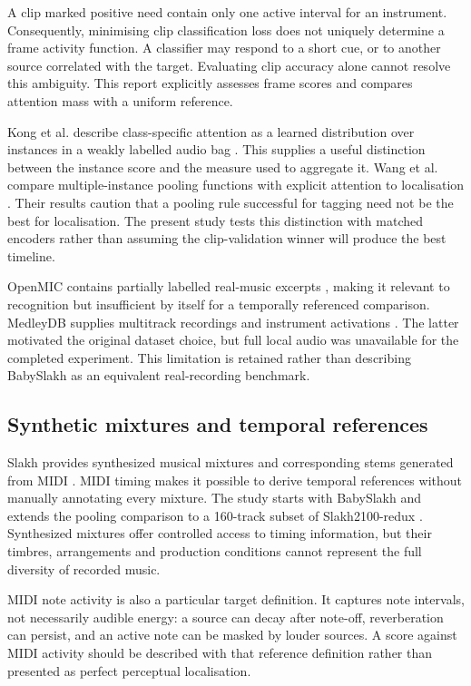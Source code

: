 \documentclass[10pt,a4paper]{article}
\begin{document}
A clip marked positive need contain only one active interval for an instrument. Consequently, minimising clip classification loss does not uniquely determine a frame activity function. A classifier may respond to a short cue, or to another source correlated with the target. Evaluating clip accuracy alone cannot resolve this ambiguity. This report explicitly assesses frame scores and compares attention mass with a uniform reference.

Kong et al. describe class-specific attention as a learned distribution over instances in a weakly labelled audio bag \cite{kongattention}. This supplies a useful distinction between the instance score and the measure used to aggregate it. Wang et al. compare multiple-instance pooling functions with explicit attention to localisation \cite{milpooling}. Their results caution that a pooling rule successful for tagging need not be the best for localisation. The present study tests this distinction with matched encoders rather than assuming the clip-validation winner will produce the best timeline.

OpenMIC contains partially labelled real-music excerpts \cite{openmic}, making it relevant to recognition but insufficient by itself for a temporally referenced comparison. MedleyDB supplies multitrack recordings and instrument activations \cite{medleydb}. The latter motivated the original dataset choice, but full local audio was unavailable for the completed experiment. This limitation is retained rather than describing BabySlakh as an equivalent real-recording benchmark.

\subsection{Synthetic mixtures and temporal references}
Slakh provides synthesized musical mixtures and corresponding stems generated from MIDI \cite{slakh}. MIDI timing makes it possible to derive temporal references without manually annotating every mixture. The study starts with BabySlakh \cite{babyslakhrelease} and extends the pooling comparison to a 160-track subset of Slakh2100-redux \cite{slakhredux}. Synthesized mixtures offer controlled access to timing information, but their timbres, arrangements and production conditions cannot represent the full diversity of recorded music.

MIDI note activity is also a particular target definition. It captures note intervals, not necessarily audible energy: a source can decay after note-off, reverberation can persist, and an active note can be masked by louder sources. A score against MIDI activity should be described with that reference definition rather than presented as perfect perceptual localisation.
\end{document}
